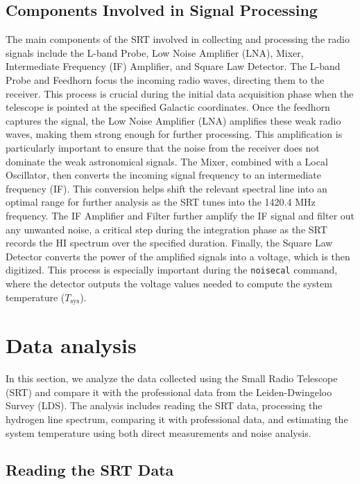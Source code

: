 \documentclass[linenumbers,twocolumn]{aastex631}
\begin{document}
\subsection{Components Involved in Signal Processing}

The main components of the SRT involved in collecting and processing the radio signals include the L-band Probe, Low Noise Amplifier (LNA), Mixer, Intermediate Frequency (IF) Amplifier, and Square Law Detector. The L-band Probe and Feedhorn focus the incoming radio waves, directing them to the receiver. This process is crucial during the initial data acquisition phase when the telescope is pointed at the specified Galactic coordinates. Once the feedhorn captures the signal, the Low Noise Amplifier (LNA) amplifies these weak radio waves, making them strong enough for further processing. This amplification is particularly important to ensure that the noise from the receiver does not dominate the weak astronomical signals. The Mixer, combined with a Local Oscillator, then converts the incoming signal frequency to an intermediate frequency (IF). This conversion helps shift the relevant spectral line into an optimal range for further analysis as the SRT tunes into the 1420.4 MHz frequency. The IF Amplifier and Filter further amplify the IF signal and filter out any unwanted noise, a critical step during the integration phase as the SRT records the HI spectrum over the specified duration. Finally, the Square Law Detector converts the power of the amplified signals into a voltage, which is then digitized. This process is especially important during the \texttt{noisecal} command, where the detector outputs the voltage values needed to compute the system temperature ($T_{\text{sys}}$).

\section{Data analysis} 
\label{sec:results}

In this section, we analyze the data collected using the Small Radio Telescope (SRT) and compare it with the professional data from the Leiden-Dwingeloo Survey (LDS). The analysis includes reading the SRT data, processing the hydrogen line spectrum, comparing it with professional data, and estimating the system temperature using both direct measurements and noise analysis.

\subsection{Reading the SRT Data}
\end{document}
